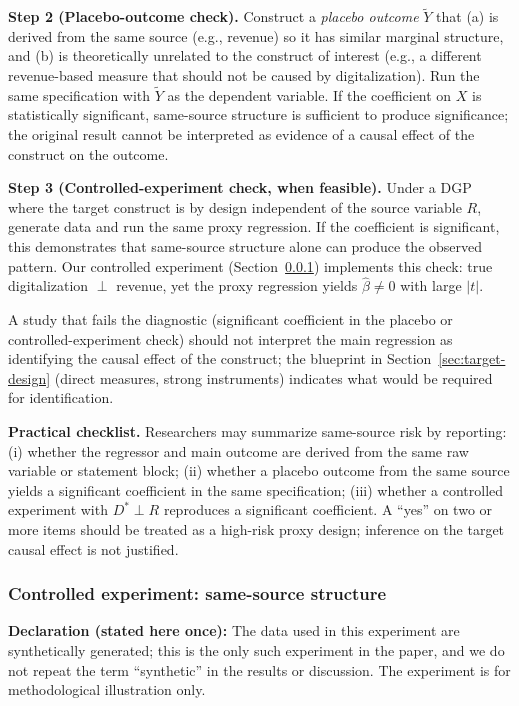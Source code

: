 \textbf{Step 2 (Placebo-outcome check).} Construct a \emph{placebo outcome} $\tilde{Y}$ that (a) is derived from the same source (e.g., revenue) so it has similar marginal structure, and (b) is theoretically unrelated to the construct of interest (e.g., a different revenue-based measure that should not be caused by digitalization). Run the same specification with $\tilde{Y}$ as the dependent variable. If the coefficient on $X$ is statistically significant, same-source structure is sufficient to produce significance; the original result cannot be interpreted as evidence of a causal effect of the construct on the outcome.

\textbf{Step 3 (Controlled-experiment check, when feasible).} Under a DGP where the target construct is by design independent of the source variable $R$, generate data and run the same proxy regression. If the coefficient is significant, this demonstrates that same-source structure alone can produce the observed pattern. Our controlled experiment (Section~\ref{sec:synthetic-experiment}) implements this check: true digitalization $\perp$ revenue, yet the proxy regression yields $\hat{\beta} \neq 0$ with large $|t|$.

A study that fails the diagnostic (significant coefficient in the placebo or controlled-experiment check) should not interpret the main regression as identifying the causal effect of the construct; the blueprint in Section~\ref{sec:target-design} (direct measures, strong instruments) indicates what would be required for identification.

\textbf{Practical checklist.} Researchers may summarize same-source risk by reporting: (i) whether the regressor and main outcome are derived from the same raw variable or statement block; (ii) whether a placebo outcome from the same source yields a significant coefficient in the same specification; (iii) whether a controlled experiment with $D^* \perp R$ reproduces a significant coefficient. A ``yes'' on two or more items should be treated as a high-risk proxy design; inference on the target causal effect is not justified.

\subsubsection{Controlled experiment: same-source structure}
\label{sec:synthetic-experiment}

\textbf{Declaration (stated here once):} The data used in this experiment are synthetically generated; this is the only such experiment in the paper, and we do not repeat the term ``synthetic'' in the results or discussion. The experiment is for methodological illustration only.

